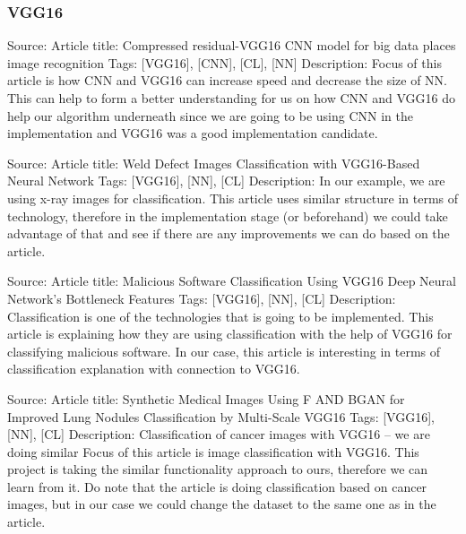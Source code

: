\subsubsection{VGG16}
Source: \parencite{qassim2018compressed}
\newline
Article title: Compressed residual-VGG16 CNN model for big data places image recognition \newline
Tags: [VGG16], [CNN], [CL], [NN]
\newline
Description:
\newline
Focus of this article is how CNN and VGG16 can increase speed and decrease the size of NN. This can help to form a better understanding for us on how CNN and VGG16 do help our algorithm underneath since we are going to be using CNN in the implementation and VGG16 was a good implementation candidate.
\newline

Source: \parencite{liu2017weld}
\newline
Article title: Weld Defect Images Classification with VGG16-Based Neural Network 
\newline
Tags: [VGG16], [NN], [CL]
\newline
Description:
\newline
In our example, we are using x-ray images for classification. This article uses similar structure in terms of technology, therefore in the implementation stage (or beforehand) we could take advantage of that and see if there are any improvements we can do based on the article.
\newline

Source: \parencite{rezende2018malicious}
\newline
Article title: Malicious Software Classification Using VGG16 Deep Neural Network’s Bottleneck Features
\newline
Tags: [VGG16], [NN], [CL]
\newline
Description:
\newline
Classification is one of the technologies that is going to be implemented. This article is explaining how they are using classification with the help of VGG16 for classifying malicious software. In our case, this article is interesting in terms of classification explanation with connection to VGG16.
\newline

Source: \parencite{zhao2018synthetic}
\newline
Article title: Synthetic Medical Images Using F AND BGAN for Improved Lung Nodules Classification by Multi-Scale VGG16
\newline
Tags: [VGG16], [NN], [CL]
\newline
Description:
\newline
Classification of cancer images with VGG16 – we are doing similar Focus of this article is image classification with VGG16. This project is taking the similar functionality approach to ours, therefore we can learn from it. Do note that the article is doing classification based on cancer images, but in our case we could change the dataset to the same one as in the article.
\newline

